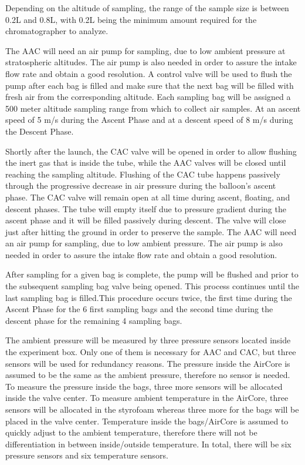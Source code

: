 Depending on the altitude of sampling, the range of the sample size is between 0.2L and 0.8L, with 0.2L being the minimum amount required for the chromatographer to analyze. 

The AAC will need an air pump for sampling, due to low ambient pressure at stratospheric altitudes. The air pump is also needed in order to assure the intake flow rate and obtain a good resolution. A control valve will be used to flush the pump after each bag is filled and make sure that the next bag will be filled with fresh air from the corresponding altitude. Each sampling bag will be assigned a 500 meter altitude sampling range from which to collect air samples. At an ascent speed of 5 m/s during the Ascent Phase and at a descent speed of 8 m/s during the Descent Phase. 

Shortly after the launch, the CAC valve will be opened in order to allow flushing the inert gas that is inside the tube, while the AAC valves will be closed until reaching the sampling altitude. Flushing of the CAC tube happens passively through the progressive decrease in air pressure during the balloon's ascent phase. The CAC valve will remain open at all time during ascent, floating, and descent phases. The tube will empty itself due to pressure gradient during the ascent phase and it will be filled passively during descent. The valve will close just after hitting the ground in order to preserve the sample. The AAC will need an air pump for sampling, due to low ambient pressure. The air pump is also needed in order to assure the intake flow rate and obtain a good resolution.

After sampling for a given bag is complete, the pump will be flushed and prior to the subsequent sampling bag valve being opened. This process continues until the last sampling bag is filled.This procedure occurs twice, the first time during the Ascent Phase for the 6 first sampling bags and the second time during the descent phase for the remaining 4 sampling bags.

The ambient pressure will be measured by three pressure sensors located inside the experiment box. Only one of them is necessary for AAC and CAC, but three sensors will be used for redundancy reasons. The pressure inside the AirCore is assumed to be the same as the ambient pressure, therefore no sensor is needed. To measure the pressure inside the bags, three more sensors will be allocated inside the valve center. To measure ambient temperature in the AirCore, three sensors will be allocated in the styrofoam whereas three more for the bags will be placed in the valve center. Temperature inside the bags/AirCore is assumed to quickly adjust to the ambient temperature, therefore there will not be differentiation in between inside/outside temperature. In total, there will be six pressure sensors and six temperature sensors. 


